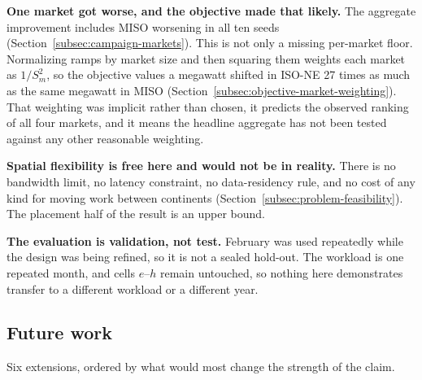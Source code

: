 ﻿\documentclass[12pt]{article}
\begin{document}
\textbf{One market got worse, and the objective made that likely.} The
aggregate improvement includes MISO worsening in all ten seeds
(Section~\ref{subsec:campaign-markets}). This is not only a missing per-market
floor. Normalizing ramps by market size and then squaring them weights each
market as \(1/S_m^{2}\), so the objective values a megawatt shifted in ISO-NE 27
times as much as the same megawatt in MISO
(Section~\ref{subsec:objective-market-weighting}). That weighting was implicit
rather than chosen, it predicts the observed ranking of all four markets, and it
means the headline aggregate has not been tested against any other reasonable
weighting.

\textbf{Spatial flexibility is free here and would not be in reality.} There is
no bandwidth limit, no latency constraint, no data-residency rule, and no cost
of any kind for moving work between continents
(Section~\ref{subsec:problem-feasibility}). The placement half of the result is
an upper bound.

\textbf{The evaluation is validation, not test.} February was used repeatedly
while the design was being refined, so it is not a sealed hold-out. The
workload is one repeated month, and cells \(e\)--\(h\) remain untouched, so
nothing here demonstrates transfer to a different workload or a different year.

\subsection{Future work}
\label{subsec:conclusion-future}

Six extensions, ordered by what would most change the strength of the claim.
\end{document}
